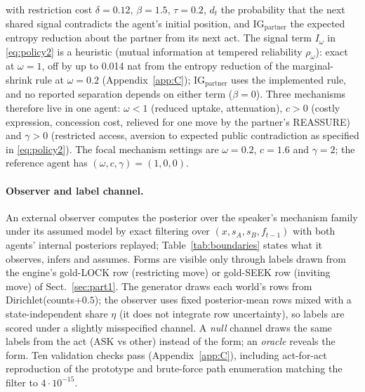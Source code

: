 \documentclass[runningheads]{llncs}
\newcommand{\Iw}{I_{\omega}}
\begin{document}
with restriction cost $\delta=0.12$, $\beta=1.5$, $\tau=0.2$, $d_t$ the probability that the next shared signal contradicts the agent's initial position, and $\mathrm{IG}_{\text{partner}}$ the expected entropy reduction about the partner from its next act. The signal term $\Iw$ in \eqref{eq:policy2} is a heuristic (mutual information at tempered reliability $\rho_\omega$): exact at $\omega=1$, off by up to 0.014 nat from the entropy reduction of the marginal-shrink rule at $\omega=0.2$ (Appendix~\ref{app:C}); $\mathrm{IG}_{\text{partner}}$ uses the implemented rule, and no reported separation depends on either term ($\beta=0$). Three mechanisms therefore live in one agent: $\omega<1$ (reduced uptake, attenuation), $c>0$ (costly expression, concession cost, relieved for one move by the partner's REASSURE) and $\gamma>0$ (restricted access, aversion to expected public contradiction as specified in \eqref{eq:policy2}). The focal mechanism settings are $\omega=0.2$, $c=1.6$ and $\gamma=2$; the reference agent has $(\omega,c,\gamma)=(1,0,0)$.

\paragraph{Observer and label channel.} An external observer computes the posterior over the speaker's mechanism family under its assumed model by exact filtering over $(x,s_A,s_B,f_{t-1})$ with both agents' internal posteriors replayed; Table~\ref{tab:boundaries} states what it observes, infers and assumes. Forms are visible only through labels drawn from the engine's gold-LOCK row (restricting move) or gold-SEEK row (inviting move) of Sect.~\ref{sec:part1}. The generator draws each world's rows from Dirichlet(counts$+0.5$); the observer uses fixed posterior-mean rows mixed with a state-independent share $\eta$ (it does not integrate row uncertainty), so labels are scored under a slightly misspecified channel. A \emph{null} channel draws the same labels from the act (ASK vs other) instead of the form; an \emph{oracle} reveals the form. Ten validation checks pass (Appendix~\ref{app:C}), including act-for-act reproduction of the prototype and brute-force path enumeration matching the filter to $4\cdot10^{-15}$.
\end{document}
